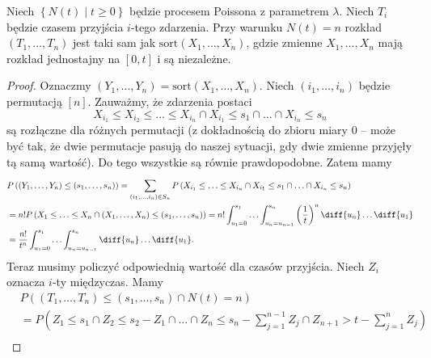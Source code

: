 \begin{theorem}[Twierdzenie 8.14 P\&C]
	Niech \(\left\{ N\left( t  \right) \mid t\ge 0 \right\} \) będzie procesem Poissona z parametrem \(\lambda\). Niech \(T_i\) będzie czasem przyjścia \(i\)-tego zdarzenia. Przy warunku \(N\left( t  \right) = n \) rozkład \(\left( T_1,\ldots,T_n \right) \) jest taki sam jak \(\mathrm{sort}\left( X_1,\ldots,X_n \right) \), gdzie zmienne \(X_1,\ldots,X_n\) mają rozkład jednostajny na \([0,t]\) i są niezależne.
\end{theorem}
\begin{proof}
	Oznaczmy \(\left( Y_1,\ldots,Y_n \right) = \mathrm{sort}\left( X_1,\ldots,X_n \right) \). Niech \(\left( i_1,\ldots,i_n \right) \) będzie permutacją \([n]\). Zauważmy, że zdarzenia postaci
	\[ X_{i_1} \le X_{i_2} \le \ldots \le X_{i_n} \cap X_{i_1} \le s_1 \cap \ldots \cap X_{i_n}\le s_n \]
	są rozłączne dla różnych permutacji (z dokładnością do zbioru miary \(0\) -- może być tak, że dwie permutacje pasują do naszej sytuacji, gdy dwie zmienne przyjęły tą samą wartość). Do tego wszystkie są równie prawdopodobne. Zatem mamy
	\begin{align*}
		 & P\left( \left( Y_1,\ldots,Y_n \right) \le \left( s_1,\ldots,s_n \right)  \right)  = \sum_{\left( i_1,\ldots,i_n \right) \in S_n}^{} P\left( X_{i_1}\le \ldots\le X_{i_n} \cap X_{i_1} \le s_1 \cap \ldots \cap X_{i_n}\le s_n \right) \\
		 & = n! P\left( X_1\le \ldots\le X_n \cap \left( X_1,\ldots,X_n \right) \le \left( s_1,\ldots,s_n \right)  \right) = n!\int_{u_1=0}^{s_1} \ldots \int_{u_n=u_{n-1}}^{s_n} \left( \frac{1}{t} \right) ^{n} \diff{u_n} \ldots \diff{u_{1}} \\
		 & = \frac{n!}{t ^{n}} \int_{u_1=0}^{s_1} \ldots \int_{u_n=u_{n-1}}^{s_n} \diff{u_n} \ldots\diff{u_1} .
	\end{align*}
	Teraz musimy policzyć odpowiednią wartość dla czasów przyjścia. Niech \(Z_i\) oznacza \(i\)-ty międzyczas. Mamy
	\begin{align*}
		 & P\left( \left( T_1,\ldots,T_n \right) \le \left( s_1,\ldots,s_n \right) \cap  N\left( t  \right) = n \right)                                                                                                                                   \\
		 & = P\left( Z_1\le s_1 \cap Z_2\le s_2-Z_1 \cap \ldots\cap Z_n \le s_n - \sum_{j=1}^{n-1} Z_j \cap Z_{n+1} > t- \sum_{j=1}^{n} Z_j \right)                                                                                                       \\

\end{align*}
\end{proof}
